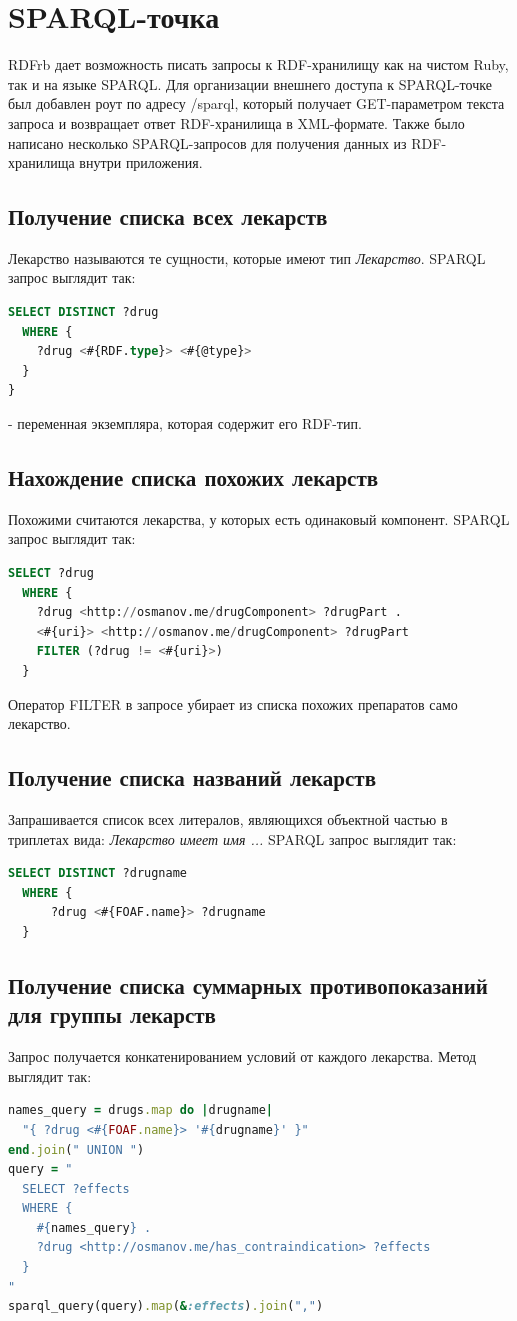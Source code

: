 \documentclass[specialist,subf,href,colorlinks=true
]{disser}
\begin{document}
\section{SPARQL-точка}
RDFrb дает возможность писать запросы к RDF-хранилищу как на чистом Ruby, так и на языке SPARQL. Для организации внешнего доступа к SPARQL-точке был добавлен роут по адресу /sparql, который получает GET-параметром текста запроса и возвращает ответ RDF-хранилища в XML-формате.
Также было написано несколько SPARQL-запросов для получения данных из RDF-хранилища внутри приложения.
\subsection{Получение списка всех лекарств}
Лекарство называются те сущности, которые имеют тип \textit{Лекарство}. SPARQL запрос выглядит так:
\begin{lstlisting}[language=SQL]
SELECT DISTINCT ?drug 
  WHERE {
    ?drug <#{RDF.type}> <#{@type}>
  }
}
\end{lstlisting}
\textit{\@type} - переменная экземпляра, которая содержит его RDF-тип. 
\subsection{Нахождение списка похожих лекарств}
Похожими считаются лекарства, у которых есть одинаковый компонент. SPARQL запрос выглядит так:
\begin{lstlisting}[language=SQL]
  SELECT ?drug 
  WHERE {
    ?drug <http://osmanov.me/drugComponent> ?drugPart .
    <#{uri}> <http://osmanov.me/drugComponent> ?drugPart
    FILTER (?drug != <#{uri}>)
  }
\end{lstlisting}
Оператор FILTER в запросе убирает из списка похожих препаратов само лекарство.
\subsection{Получение списка названий лекарств}
Запрашивается список всех литералов, являющихся объектной частью в триплетах вида: \textit{Лекарство имеет имя ...} SPARQL запрос выглядит так:
\begin{lstlisting}[language=SQL]
  SELECT DISTINCT ?drugname 
  WHERE {
	  ?drug <#{FOAF.name}> ?drugname
  }
\end{lstlisting}
\subsection{Получение списка суммарных противопоказаний для группы лекарств}
Запрос получается конкатенированием условий от каждого лекарства. Метод выглядит так:
\begin{lstlisting}[language=Ruby]
names_query = drugs.map do |drugname|
  "{ ?drug <#{FOAF.name}> '#{drugname}' }"
end.join(" UNION ")
query = "
  SELECT ?effects
  WHERE {
    #{names_query} .
    ?drug <http://osmanov.me/has_contraindication> ?effects
  }
"
sparql_query(query).map(&:effects).join(",")
\end{lstlisting}
\end{document}
